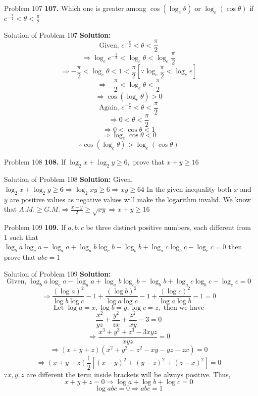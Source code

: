 \documentclass[aspectratio=169,8pt]{beamer}
\begin{document}
\begin{frame}{Problem 107}
  \textbf{107.} Which one is greater among $\cos(\log_e\theta)$ or $\log_e(\cos\theta)$ if $e^{-\frac{\pi}{2}} < \theta < \frac{\pi}{2}$
\end{frame}
\begin{frame}{Solution of Problem 107}
  \textbf{Solution:} $$\text{Given,~}e^{-\frac{\pi}{2}} < \theta < \frac{\pi}{2}$$
  $$\Rightarrow \log_ee^{-\frac{\pi}{2}} < \log_e\theta < \log_e\frac{\pi}{2}$$
  $$\Rightarrow -\frac{\pi}{2}<\log_e\theta < 1< \frac{\pi}{2}[\because \log_e\frac{\pi}{2} < \log_ee]$$
  $$\Rightarrow -\frac{\pi}{2}<\log_e\theta < \frac{\pi}{2}$$
  $$\Rightarrow \cos(\log_e\theta) > 0$$
  $$\text{Again,~}e^{-\frac{\pi}{2}} < \theta < \frac{\pi}{2}$$
  $$\Rightarrow 0 < \theta < \frac{\pi}{2}$$
  $$\Rightarrow 0 < \cos\theta < 1$$
  $$\Rightarrow \log_e\cos\theta < 0$$
  $$\therefore \cos(\log_e\theta) > \log_e(\cos\theta)$$
\end{frame}
\begin{frame}{Problem 108}
  \textbf{108.} If $\log_2x + \log_2y \geq 6,$ prove that $x + y \geq 16$
\end{frame}
\begin{frame}{Solution of Problem 108}
  \textbf{Solution:} Given, $\log_2x + \log_2 y \geq 6 \Rightarrow \log_2xy \geq 6 \Rightarrow xy \geq 64$
  \linebreak\linebreak
  In the given inequality both $x$ and $y$ are positive values as negative values will make the logarithm invalid.
  \linebreak\linebreak
  We know that $A.M. \geq G.M. \Rightarrow \frac{x + y}{2} \geq \sqrt{xy}\Rightarrow x + y \geq 16$
\end{frame}
\begin{frame}{Problem 109}
  \textbf{109.} If $a, b, c$ be three distinct positive numbers, each different from $1$ such that $\log_ba\log_ca - \log_aa + \log_ab\log_cb - \log_bb + \log_ac\log_bc - \log_cc = 0$ then prove that $abc = 1$
\end{frame}
\begin{frame}{Solution of Problem 109}
  \textbf{Solution:} $$\text{Given,~}\log_ba\log_ca - \log_aa + \log_ab\log_cb - \log_bb + \log_ac\log_bc - \log_cc = 0$$
  $$\Rightarrow \frac{(\log a)^2}{\log b\log c} - 1 + \frac{(\log b)^2}{\log a\log c} - 1 + \frac{(\log c)^2}{\log a\log b} -1 = 0$$
  $$\text{Let~}\log a = x, \log b = y, \log c = z, \text{~then we have}$$
  $$\frac{x^2}{yz} + \frac{y^2}{zx} + \frac{z^2}{xy} - 3 = 0$$
  $$\Rightarrow \frac{x^3 + y^3 + z^3 - 3xyz}{xyz} = 0$$
  $$\Rightarrow (x + y + z)(x^2 + y^2 + z^2 - xy - yz - zx) = 0$$
  $$\Rightarrow (x + y + z)\frac{1}{2}[(x - y)^2 + (y - z)^2 + (z - x)^2] = 0$$
  $\because x, y, z$ are different the term inside brackets will be always positive. Thus,
  $$x + y + z = 0 \Rightarrow \log a + \log b + \log c = 0$$
  $$\log abc = 0\Rightarrow abc = 1$$
\end{frame}
\end{document}
